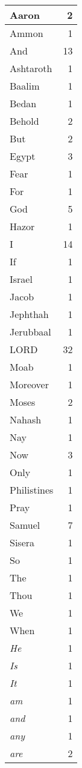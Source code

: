 \begin{center}
\begin{longtable}{l|r}
\hline \hline
\endlastfoot
Aaron & 2 \\ \hline
Ammon & 1 \\ \hline
And & 13 \\ \hline
Ashtaroth & 1 \\ \hline
Baalim & 1 \\ \hline
Bedan & 1 \\ \hline
Behold & 2 \\ \hline
But & 2 \\ \hline
Egypt & 3 \\ \hline
Fear & 1 \\ \hline
For & 1 \\ \hline
God & 5 \\ \hline
Hazor & 1 \\ \hline
I & 14 \\ \hline
If & 1 \\ \hline
Israel & 1 \\ \hline
Jacob & 1 \\ \hline
Jephthah & 1 \\ \hline
Jerubbaal & 1 \\ \hline
LORD & 32 \\ \hline
Moab & 1 \\ \hline
Moreover & 1 \\ \hline
Moses & 2 \\ \hline
Nahash & 1 \\ \hline
Nay & 1 \\ \hline
Now & 3 \\ \hline
Only & 1 \\ \hline
Philistines & 1 \\ \hline
Pray & 1 \\ \hline
Samuel & 7 \\ \hline
Sisera & 1 \\ \hline
So & 1 \\ \hline
The & 1 \\ \hline
Thou & 1 \\ \hline
We & 1 \\ \hline
When & 1 \\ \hline
\emph{He} & 1 \\ \hline
\emph{Is} & 1 \\ \hline
\emph{It} & 1 \\ \hline
\emph{am} & 1 \\ \hline
\emph{and} & 1 \\ \hline
\emph{any} & 1 \\ \hline
\emph{are} & 2 \\ \hline

\end{longtable}
\end{center}
